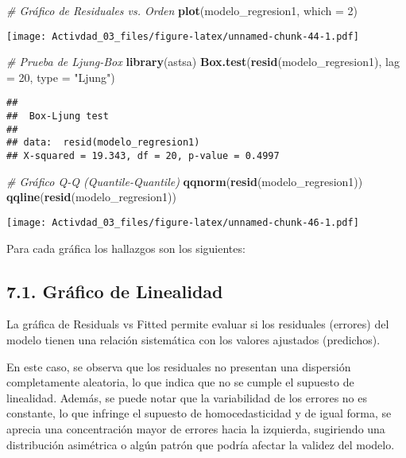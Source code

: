 \documentclass[
]{article}
\newenvironment{Shaded}{\begin{snugshade}}{\end{snugshade}}
\newcommand{\AttributeTok}[1]{\textcolor[rgb]{0.13,0.29,0.53}{#1}}
\newcommand{\CommentTok}[1]{\textcolor[rgb]{0.56,0.35,0.01}{\textit{#1}}}
\newcommand{\DecValTok}[1]{\textcolor[rgb]{0.00,0.00,0.81}{#1}}
\newcommand{\FunctionTok}[1]{\textcolor[rgb]{0.13,0.29,0.53}{\textbf{#1}}}
\newcommand{\NormalTok}[1]{#1}
\newcommand{\StringTok}[1]{\textcolor[rgb]{0.31,0.60,0.02}{#1}}
\begin{document}
\begin{Shaded}
\begin{Highlighting}[]
\CommentTok{\# Gráfico de Residuales vs. Orden}
\FunctionTok{plot}\NormalTok{(modelo\_regresion1, }\AttributeTok{which =} \DecValTok{2}\NormalTok{)}
\end{Highlighting}
\end{Shaded}

\texttt{[image: Activdad\_03\_files/figure-latex/unnamed-chunk-44-1.pdf]}

\begin{Shaded}
\begin{Highlighting}[]
\CommentTok{\# Prueba de Ljung{-}Box}
\FunctionTok{library}\NormalTok{(astsa)}
\FunctionTok{Box.test}\NormalTok{(}\FunctionTok{resid}\NormalTok{(modelo\_regresion1), }\AttributeTok{lag =} \DecValTok{20}\NormalTok{, }\AttributeTok{type =} \StringTok{"Ljung"}\NormalTok{)}
\end{Highlighting}
\end{Shaded}

\begin{verbatim}
## 
##  Box-Ljung test
## 
## data:  resid(modelo_regresion1)
## X-squared = 19.343, df = 20, p-value = 0.4997
\end{verbatim}

\begin{Shaded}
\begin{Highlighting}[]
\CommentTok{\# Gráfico Q{-}Q (Quantile{-}Quantile)}
\FunctionTok{qqnorm}\NormalTok{(}\FunctionTok{resid}\NormalTok{(modelo\_regresion1))}
\FunctionTok{qqline}\NormalTok{(}\FunctionTok{resid}\NormalTok{(modelo\_regresion1))}
\end{Highlighting}
\end{Shaded}

\texttt{[image: Activdad\_03\_files/figure-latex/unnamed-chunk-46-1.pdf]}

Para cada gráfica los hallazgos son los siguientes:

\subsection{\texorpdfstring{\textbf{7.1. Gráfico de
Linealidad}}{7.1. Gráfico de Linealidad}}\label{gruxe1fico-de-linealidad}

La gráfica de Residuals vs Fitted permite evaluar si los residuales
(errores) del modelo tienen una relación sistemática con los valores
ajustados (predichos).

En este caso, se observa que los residuales no presentan una dispersión
completamente aleatoria, lo que indica que no se cumple el supuesto de
linealidad. Además, se puede notar que la variabilidad de los errores no
es constante, lo que infringe el supuesto de homocedasticidad y de igual
forma, se aprecia una concentración mayor de errores hacia la izquierda,
sugiriendo una distribución asimétrica o algún patrón que podría afectar
la validez del modelo.
\end{document}
